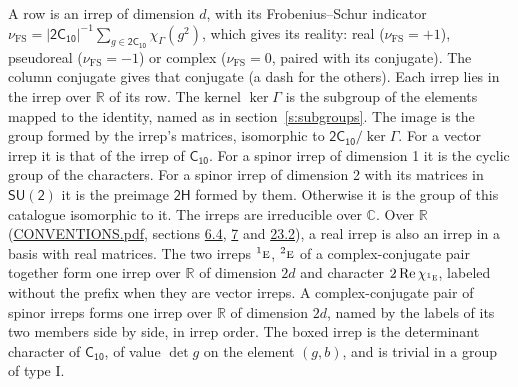 \documentclass[10pt,a4paper]{article}
\numberwithin{equation}{section}
\newcommand{\grp}[1]{\mathsf{#1}}
\newcommand{\irr}[1]{\text{\normalfont\scshape #1}}
\newcommand{\conjpair}[1]{{}^{#1}}
\newcommand{\irchar}[1]{\chi_{#1}}
\newcommand{\fsind}{\nu_{\mathrm{FS}}}
\begin{document}
\leavevmode\label{n:index.frobenius}\label{n:head.irrep}\label{n:head.reality}A row is an irrep of dimension $d$, with its Frobenius--Schur indicator $\fsind = |\grp{2C_{10}}|^{-1}\allowbreak\sum_{g\in\grp{2C_{10}}}\irchar{\Gamma}(g^2)$, which gives its reality: real ($\fsind = +1$), pseudoreal ($\fsind = -1$) or complex ($\fsind = 0$, paired with its conjugate). \label{n:head.conjugate}The column conjugate gives that conjugate (a dash for the others). \label{n:head.over.real}Each irrep lies in the irrep over $\mathbb{R}$ of its row. \label{n:head.kernel}The kernel $\ker\Gamma$ is the subgroup of the elements mapped to the identity, named as in section~\ref{s:subgroups}. \label{n:head.image}The image is the group formed by the irrep's matrices, isomorphic to $\grp{2C_{10}}/\ker\Gamma$. For a vector irrep it is that of the irrep of \href{../../../rotation/data/pdf/C10.pdf}{$\grp{C_{10}}$}. For a spinor irrep of dimension 1 it is the cyclic group of the characters. For a spinor irrep of dimension 2 with its matrices in $\grp{SU(2)}$ it is the preimage $\grp{2H}$ formed by them. Otherwise it is the group of this catalogue isomorphic to it. The irreps are irreducible over $\mathbb{C}$. Over $\mathbb{R}$ (\href{../../CONVENTIONS.pdf}{CONVENTIONS.pdf}, sections \href{../../../rotation/CONVENTIONS.pdf\#conv.6.4}{6.4}, \href{../../../rotation/CONVENTIONS.pdf\#conv.7}{7} and \href{../../CONVENTIONS.pdf\#conv.23.2}{23.2}), a real irrep is also an irrep in a basis with real matrices. The two irreps $\conjpair{1}\irr{e}$, $\conjpair{2}\irr{e}$ of a complex-conjugate pair together form one irrep over $\mathbb{R}$ of dimension $2d$ and character $2\operatorname{Re}\irchar{\conjpair{1}\irr{e}}$, labeled without the prefix when they are vector irreps. A complex-conjugate pair of spinor irreps forms one irrep over $\mathbb{R}$ of dimension $2d$, named by the labels of its two members side by side, in irrep order. \label{n:mark.determinant}The boxed irrep is the determinant character of \href{../../../rotation/data/pdf/C10.pdf}{$\grp{C_{10}}$}, of value $\det g$ on the element $(g, b)$, and is trivial in a group of type I.
\setlength{\emergencystretch}{2em}\par\setlength{\emergencystretch}{0pt}
\end{document}
